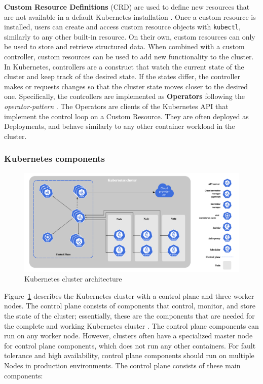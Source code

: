 \documentclass[english, 12pt, a4paper, sci, utf8, a-2b, online]{aaltothesis}
\begin{document}
\textbf{Custom Resource Definitions} (CRD) are used to define new resources that are not available in a default Kubernetes installation \cite{k8s-docs-crd}. Once a custom resource is installed, users can create and access custom resource objects with \texttt{kubectl}, similarly to any other built-in resource. On their own, custom resources can only be used to store and retrieve structured data. When combined with a custom controller, custom resources can be used to add new functionality to the cluster. In Kubernetes, controllers are a construct that watch the current state of the cluster and keep track of the desired state. If the states differ, the controller makes or requests changes so that the cluster state moves closer to the desired one. Specifically, the controllers are implemented as \textbf{Operators} following the \emph{operator-pattern} \cite{k8s-docs-operators}. The Operators are clients of the Kubernetes API that implement the control loop on a Custom Resource. They are often deployed as Deployments, and behave similarly to any other container workload in the cluster.

\subsubsection{Kubernetes components} \label{control-plane}

\begin{figure}[h!]
  \centering
  \includegraphics[width=\linewidth]{files/k8s-arch.png}
  \caption{Kubernetes cluster architecture \cite{k8s-docs-control-plane}}
  \label{figure-2}
\end{figure}

Figure~\ref{figure-2} describes the Kubernetes cluster with a control plane and three worker nodes. The control plane consists of components that control, monitor, and store the state of the cluster; essentially, these are the components that are needed for the complete and working Kubernetes cluster \cite{k8s-docs-control-plane}. The control plane components can run on any worker node. However, clusters often have a specialized master node for control plane components, which does not run any other containers. For fault tolerance and high availability, control plane components should run on multiple Nodes in production environments. The control plane consists of these main components:
\end{document}
